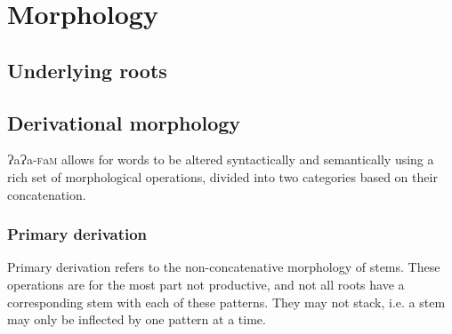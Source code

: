 \documentclass[a4paper,10pt,twoside,openright]{memoir}
\newcommand{\lang}{ɁaɁa-\textsc{f}a\textsc{m}}
\begin{document}
\chapter{Morphology}
\section{Underlying roots}
\section{Derivational morphology}

\lang{} allows for words to be altered syntactically and semantically using a rich set of morphological operations, divided into two categories based on their concatenation. 

\subsection{Primary derivation}

Primary derivation refers to the non-concatenative morphology of stems. These operations are for the most part not productive, and not all roots have a corresponding stem with each of these patterns. They may not stack, i.e. a stem may only be inflected by one pattern at a time.
\end{document}
